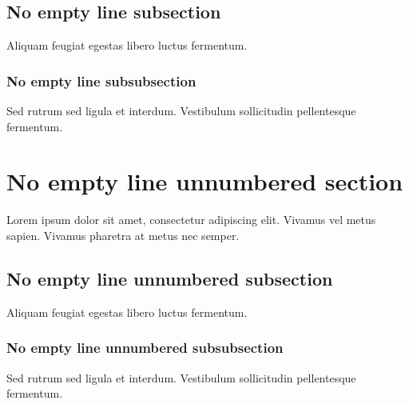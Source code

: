 \documentclass[10pt]{extarticle}
\begin{document}
\subsection{No empty line subsection}

Aliquam feugiat egestas libero luctus fermentum. 

\subsubsection{No empty line subsubsection}

Sed rutrum sed ligula et interdum. Vestibulum sollicitudin pellentesque fermentum.

\section*{No empty line unnumbered section}

Lorem ipsum dolor sit amet, consectetur adipiscing elit. Vivamus vel metus sapien. Vivamus pharetra at metus nec semper. 

\subsection*{No empty line unnumbered subsection}

Aliquam feugiat egestas libero luctus fermentum. 

\subsubsection*{No empty line unnumbered subsubsection}

Sed rutrum sed ligula et interdum. Vestibulum sollicitudin pellentesque fermentum.

\end{document}

